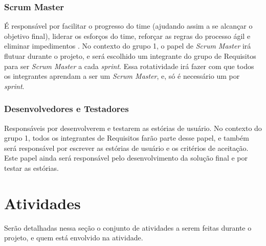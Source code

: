 \subsubsection{Scrum Master}
É responsável por facilitar o progresso do time (ajudando assim a se alcançar o objetivo final), liderar os esforços do time, reforçar as regras do processo ágil e eliminar impedimentos \cite[p. 47-48]{safe001}. No contexto do grupo 1, o papel de \emph{Scrum Master} irá flutuar durante o projeto, e será escolhido um integrante do grupo de Requisitos para ser \emph{Scrum Master} a cada \emph{sprint}. Essa rotatividade irá fazer com que todos os integrantes aprendam a ser um \emph{Scrum Master}, e, só é necessário um por \emph{sprint}.

\subsubsection{Desenvolvedores e Testadores}
Responsáveis por desenvolverem e testarem as estórias de usuário. No contexto do grupo 1, todos os integrantes de Requisitos farão parte desse papel, e também será responsável por escrever as estórias de usuário e os critérios de aceitação. Este papel ainda será responsável pelo desenvolvimento da solução final e por testar as estórias.

\section{Atividades}
Serão detalhadas nessa seção o conjunto de atividades a serem feitas durante o projeto, e quem está envolvido na atividade.


